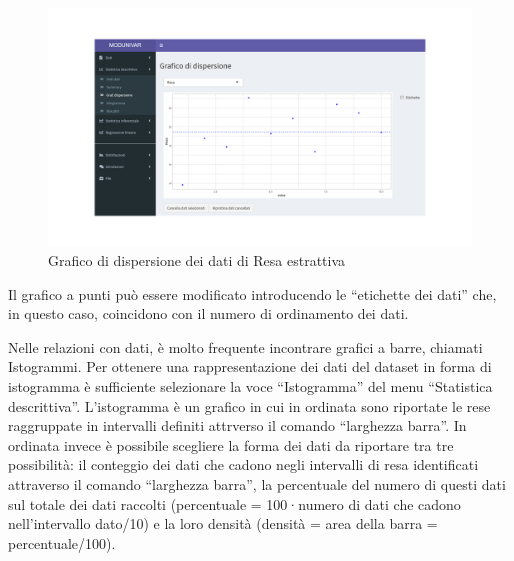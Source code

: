 \documentclass[
  11pt,
]{book}
\begin{document}
\begin{figure}

{\centering \includegraphics[width=1\linewidth]{Immagini/Descrittiva/4_Graf_dispers Resa_estrattiva} 

}

\caption{Grafico di dispersione dei dati di Resa estrattiva}\label{fig:sd4}
\end{figure}

Il grafico a punti può essere modificato introducendo le ``etichette dei dati'' che, in questo caso, coincidono con il numero di ordinamento dei dati.

Nelle relazioni con dati, è molto frequente incontrare grafici a barre, chiamati Istogrammi. Per ottenere una rappresentazione dei dati del dataset in forma di istogramma è sufficiente selezionare la voce ``Istogramma'' del menu ``Statistica descrittiva''. L'istogramma è un grafico in cui in ordinata sono riportate le rese raggruppate in intervalli definiti attrverso il comando ``larghezza barra''. In ordinata invece è possibile scegliere la forma dei dati da riportare tra tre possibilità: il conteggio dei dati che cadono negli intervalli di resa identificati attraverso il comando ``larghezza barra'', la percentuale del numero di questi dati sul totale dei dati raccolti (percentuale = 100·numero di dati che cadono nell'intervallo dato/10) e la loro densità (densità = area della barra = percentuale/100).
\end{document}
